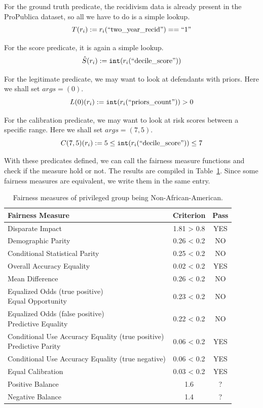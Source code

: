 \documentclass[conference]{IEEEtran}
\begin{document}
For the ground truth predicate, the recidivism data is already present in the ProPublica dataset, so all we have to do is a simple lookup.
\[
    T(r_i) := r_i(\text{``two\_year\_recid''}) == \text{``1''}
\]

For the score predicate, it is again a simple lookup.
\[
    \hat{S}(r_i) := \mathtt{int}(r_i(\text{``decile\_score''}))
\]

For the legitimate predicate, we may want to look at defendants with priors. Here we shall set $args = (0)$.
\[
    L(0)(r_i) := \mathtt{int}(r_i(\text{``priors\_count''})) > 0
\]

For the calibration predicate, we may want to look at risk scores between a specific range. Here we shall set $args = (7,5)$.
\[
    C(7,5)(r_i) := 5 \leq \mathtt{int}(r_i(\text{``decile\_score''})) \leq 7
\]

With these predicates defined, we can call the fairness measure functions and check if the measure hold or not. The results are compiled in Table~\ref{tab:results}. Since some fairness measures are equivalent, we write them in the same entry.

\begin{table}[h]
    \centering
    \begin{tabular}{|l|c|c|} %
        \hline
        \textbf{Fairness Measure} & \textbf{Criterion} & \textbf{Pass} \\
        \hline
Disparate Impact & 1.81 > 0.8 & YES \\
\hline
Demographic Parity & 0.26 < 0.2 & NO \\
\hline
Conditional Statistical Parity & 0.25 < 0.2 & NO \\
\hline
Overall Accuracy Equality & 0.02 < 0.2 & YES \\
\hline
Mean Difference & 0.26 < 0.2 & NO \\
\hline
\makecell[l]{Equalized Odds (true positive) \\ Equal Opportunity} & 0.23 < 0.2 & NO \\
\hline
\makecell[l]{Equalized Odds (false positive) \\ Predictive Equality} & 0.22 < 0.2 & NO \\
\hline
\makecell[l]{Conditional Use Accuracy Equality (true positive) \\ Predictive Parity} & 0.06 < 0.2 & YES \\
\hline
Conditional Use Accuracy Equality (true negative) & 0.06 < 0.2 & YES \\
\hline
Equal Calibration & 0.03 < 0.2 & YES \\
\hline
Positive Balance & 1.6 & ? \\
\hline
Negative Balance & 1.4 & ? \\
\hline
    \end{tabular}
    \caption{Fairness measures of privileged group being Non-African-American.}
    \label{tab:results}
\end{table}
\end{document}
